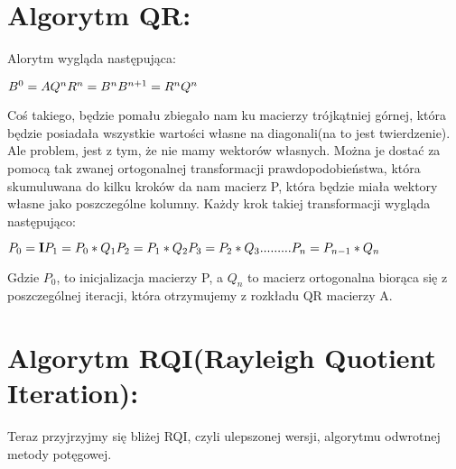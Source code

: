 \documentclass[12pt]{article}
\begin{document}
\section{Algorytm QR:}
Alorytm wygląda następująca:
\begin{center}
    \begin{math}
        B^{0} = A \newline
        Q^{n}R^{n} = B^{n}
        B^{n+1} = R^{n}Q^{n}
    \end{math}
\end{center}
Coś takiego, będzie pomału zbiegało nam ku macierzy trójkątniej górnej, która będzie posiadała wszystkie wartości własne na diagonali(na to jest twierdzenie). Ale problem, jest z tym, że nie mamy wektorów własnych. Można je dostać za pomocą tak zwanej ortogonalnej transformacji prawdopodobieństwa, która skumuluwana do kilku kroków da nam macierz P, która będzie miała wektory własne jako poszczególne kolumny. Każdy krok takiej transformacji wygląda następująco:
\begin{center}
    \begin{math}
        P_{0} = \mathbf{I} \newline
        P_{1} = P_{0}*Q_{1} \newline
        P_{2} = P_{1}*Q_{2} \newline
        P_{3} = P_{2}*Q_{3} \newline
        .........\newline
        P_{n} = P_{n-1}*Q_{n}
    \end{math}
\end{center}
Gdzie $P_{0}$, to inicjalizacja macierzy P, a $Q_{n}$ to macierz ortogonalna biorąca się z poszczególnej iteracji, która otrzymujemy z rozkładu QR macierzy A.
\section{Algorytm RQI(Rayleigh Quotient Iteration):} 
Teraz przyjrzyjmy się bliżej RQI, czyli ulepszonej wersji, algorytmu odwrotnej metody potęgowej.
\end{document}
